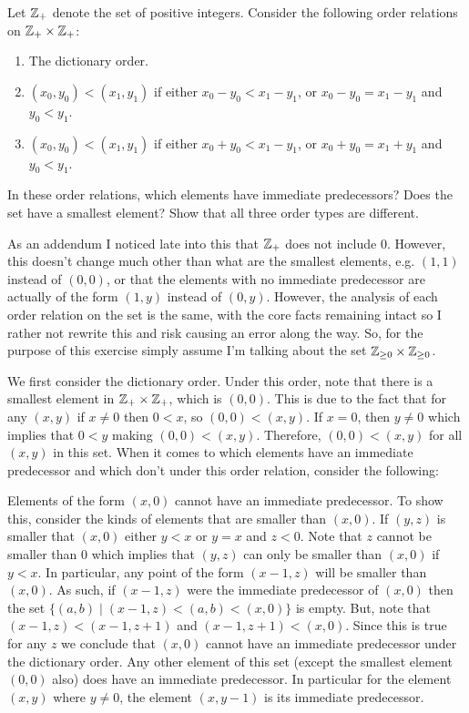 \documentclass[12pt]{article}
\begin{document}
 Let $\mathbb{Z}_+$ denote the set of positive integers. Consider the following 
order relations on $\mathbb{Z}_+ \times \mathbb{Z}_+$:
\begin{enumerate}[label=(\roman*)]
	\item The dictionary order.
	\item $(x_0, y_0) < (x_1, y_1)$ if either $x_0 - y_0 < x_1 - y_1$, or 
	$x_0 - y_0 = x_1 - y_1$ and $y_0 < y_1$.
	\item $(x_0, y_0) < (x_1, y_1)$ if either $x_0 + y_0 < x_1 - y_1$, or 
	$x_0 + y_0 = x_1 + y_1$ and $y_0 < y_1$.
\end{enumerate}
In these order relations, which elements have immediate predecessors? Does the set have 
a smallest element? Show that all three order types are different. 

As an addendum I noticed late into this that $\mathbb{Z}_+$ does not include $0$. However, this 
doesn't change much other than what are the smallest elements, e.g. $(1,1)$ instead of $(0,0)$,
or that the elements with no immediate predecessor are actually of the form $(1, y)$ instead
of $(0, y)$. However, the analysis of each order relation on the set is the same, with the core
facts remaining intact so I rather not rewrite this and risk causing an error along the way. So, 
for the purpose of this exercise simply assume I'm talking about the set
$\mathbb{Z}_{\geq 0} \times \mathbb{Z}_{\geq 0}$.

We first consider the dictionary order. Under this order, note that there is a smallest
element in $\mathbb{Z}_+ \times \mathbb{Z}_+$, which is $(0,0)$. This is due to the fact that for
any $(x, y)$ if $x \neq 0$ then $0 < x$, so $(0,0) < (x, y)$. If $x = 0$, then $y \neq 0$ which implies
that $0 < y$ making $(0, 0) < (x, y)$. Therefore, $(0,0) < (x, y)$ for all $(x, y)$ in this set.
When it comes to which elements have an immediate predecessor and which don't under this order
relation, consider the following:

Elements of the form $(x, 0)$ cannot have an immediate predecessor. To show this, consider the kinds
of elements that are smaller than $(x, 0)$. If $(y,z)$ is smaller that $(x, 0)$ either 
$y < x$ or $y = x$ and $z < 0$. Note that $z$ cannot be smaller than $0$ which implies
that $(y, z)$ can only be smaller than $(x, 0)$ if $y < x$. In particular, any point of the form
$(x - 1, z)$ will be smaller than $(x, 0)$. As such, if $(x - 1, z)$ were the immediate predecessor 
of $(x, 0)$ then the set $\{(a, b) \mid (x - 1, z) < (a, b) < (x, 0)\}$ is empty. But, note that 
$(x - 1, z) < (x - 1, z + 1)$ and $(x - 1, z + 1) < (x, 0)$. Since this is true for any $z$ we 
conclude that $(x, 0)$ cannot have an immediate predecessor under the dictionary order.
Any other element of this set (except the smallest element $(0,0)$ also) does have an immediate 
predecessor. In particular for the element $(x, y)$ where $y \neq 0$, the element $(x, y - 1)$
is its immediate predecessor. 
\end{document}
